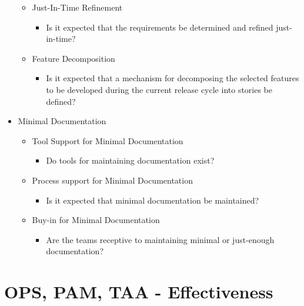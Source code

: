 \begin{appendices}
\begin{itemize}
\begin{itemize}
\begin{itemize}
				\end{itemize}
			\item Just-In-Time Refinement
				\begin{itemize}
					\item Is it expected that the requirements be determined and refined just-in-time?
				\end{itemize}
			\item Feature Decomposition
				\begin{itemize}
					\item Is it expected that a mechanism for decomposing the selected features to be developed during the current release cycle into stories be defined?
				\end{itemize}
		\end{itemize}
	\item Minimal Documentation
		\begin{itemize}
			\item Tool Support for Minimal Documentation
				\begin{itemize}
					\item Do tools for maintaining documentation exist?
				\end{itemize}
			\item Process support for Minimal Documentation
				\begin{itemize}
					\item Is it expected that minimal documentation be maintained?
				\end{itemize}
			\item Buy-in for Minimal Documentation
				\begin{itemize}
					\item Are the teams receptive to maintaining minimal or just-enough documentation?
				\end{itemize}
		\end{itemize}
\end{itemize}





\section{OPS, PAM, TAA - Effectiveness}


\end{appendices}
